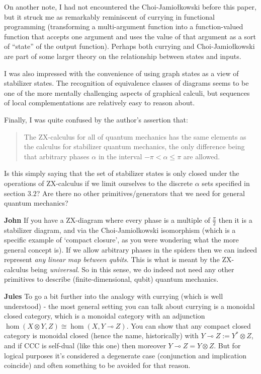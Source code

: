 \documentclass{amsart}
\newcommand{\respond}[1]{
  \vspace{1em} \textbf{#1}
}
\begin{document}
On another note, I had not encountered the Choi-Jamiołkowski before this paper, but it struck me as remarkably reminiscent of currying in functional programming (transforming a multi-argument function into a function-valued function that accepts one argument and uses the value of that argument as a sort of ``state'' of the output function). Perhaps both currying and Choi-Jamiołkowski are part of some larger theory on the relationship between states and inputs.

I was also impressed with the convenience of using graph states as a view of stabilizer states. The recognition of equivalence classes of diagrams seems to be one of the more mentally challenging aspects of graphical calculi, but sequences of local complementations are relatively easy to reason about.

Finally, I was quite confused by the author's assertion that:
\begin{quotation}
  The ZX-calculus for all of quantum mechanics has the same elements as the calculus for stabilizer quantum mechanics, the only difference being that arbitrary phases $\alpha$ in the interval $-\pi < \alpha \leq \pi$ are allowed.
\end{quotation}
Is this simply saying that the set of stabilizer states is only closed under the operations of ZX-calculus if we limit ourselves to the discrete $\alpha$ sets specified in section $3.2$? Are there no other primitives/generators that we need for general quantum mechanics?

\respond{John} If you have a ZX-diagram where every phase is a multiple of $\frac\pi2$ then it is a stabilizer diagram, and via the Choi-Jamiolkowski isomorphism (which is a specific example of `compact closure', as you were wondering what the more general concept is). If we allow arbitrary phases in the spiders then we can indeed represent \emph{any linear map between qubits}. This is what is meant by the ZX-calculus being \emph{universal}. So in this sense, we do indeed not need any other primitives to describe (finite-dimensional, qubit) quantum mechanics.

\respond{Jules} To go a bit further into the analogy with currying (which is well understood) - the most general setting you can talk about currying is a monoidal closed category, which is a monoidal category with an adjunction $\hom (X \otimes Y, Z) \cong \hom (X, Y \multimap Z)$. You can show that any compact closed category is monoidal closed (hence the name, historically) with $Y \multimap Z := Y^* \otimes Z$, and if CCC is self-dual (like this one) then moreover $Y \multimap Z = Y \otimes Z$. But for logical purposes it's considered a degenerate case (conjunction and implication coincide) and often something to be avoided for that reason.
\end{document}
